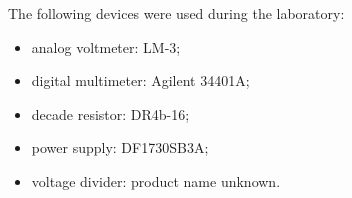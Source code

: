 The following devices were used during the laboratory:
\begin{itemize}
	\item analog voltmeter: LM-3;
	\item digital multimeter: Agilent 34401A;
	\item decade resistor: DR4b-16;
	\item power supply: DF1730SB3A;
	\item voltage divider: product name unknown.
\end{itemize}




















